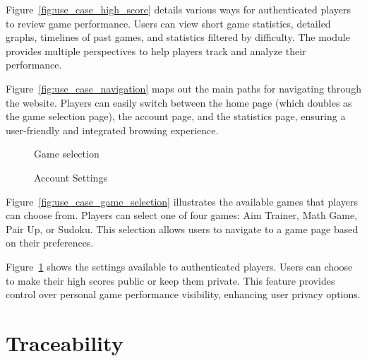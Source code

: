 \documentclass[11pt,a4paper]{article}
\newcommand{\inputdiagram}[1]{}
\newcommand{\textwidthdiagram}[2][1]{%
  \resizebox{#1\textwidth}{!}{\inputdiagram{#2}}%
}
\begin{document}
Figure~\ref{fig:use_case_high_score} details various ways for authenticated players to review game performance. Users
can view short game statistics, detailed graphs, timelines of past games, and
statistics filtered by difficulty. The module provides multiple perspectives to
help players track and analyze their performance.

Figure~\ref{fig:use_case_navigation} maps out the main paths for navigating through the website.
Players can easily switch between the home page (which doubles as the game
selection page), the account page, and the statistics page, ensuring a
user-friendly and integrated browsing experience.

\begin{figure}[H]
    \begin{minipage}[b]{0.48\textwidth}
        \centering
        \textwidthdiagram{use_case_game_selection.tex}
        \caption{Game selection}
        \label{fig:use_case_game_selection}
    \end{minipage}
    \hfil
    \begin{minipage}[b]{0.48\textwidth}
        \centering
        \textwidthdiagram{use_case_settings.tex}
        \caption{Account Settings}
        \label{fig:use_case_settings}
    \end{minipage}
\end{figure}
Figure~\ref{fig:use_case_game_selection} illustrates the available games that
players can choose from. Players can select one of four games: Aim Trainer,
Math Game, Pair Up, or Sudoku. This selection allows users to navigate to
a game page based on their preferences.

Figure~\ref{fig:use_case_settings} shows the settings available to
authenticated players. Users can choose to make their high scores public
or keep them private. This feature provides control over personal game
performance visibility, enhancing user privacy options.


\section{Traceability}
\end{document}
